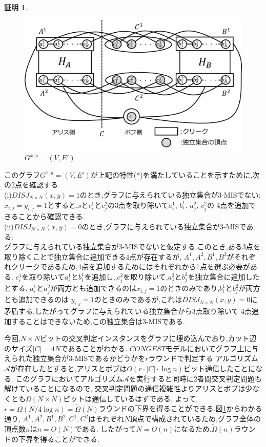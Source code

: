 \documentclass[12pt]{thesis}
\theoremstyle{definition}
\newtheorem*{prf*}{証明}
\begin{document}
\begin{prf*}
\begin{figure}[ht]
\begin{center}
\includegraphics[width=120mm]{3_Gxy.png}
\end{center}
\caption{$G^{x, y} = (V, E')$}
\label{3_G(x,y)}
\end{figure}

このグラフ$G^{x, y} = (V, E')$が上記の特性(*)を満たしていることを示すために,次の2点を確認する. \\
(i)$DISJ_{N \times N} (x, y) = 1$のとき,グラフに与えられている独立集合が3-MISでない: \\
$x_{i, j} = y_{i, j} =1$とすると,$s$と$c_{i}^{1}$と$c_{j}^{2}$の3点を取り除いて$a_{i}^{1}$, $b_{i}^{1}$, $a_{j}^{2}$, $c_{j}^{2}$の
4点を追加できることから確認できる. \\
(ii)$DISJ_{N \times N} (x, y) = 0$のとき,グラフに与えられている独立集合が3-MISである: \\ 
グラフに与えられている独立集合が3-MISでないと仮定する.このとき,ある3点を取り除くことで独立集合に追加できる4点が存在するが,
$A^{1}, A^{2}, B^{1}, B^{2}$がそれぞれクリークであるため,4点を追加するためにはそれぞれから1点を選ぶ必要がある.
$c_{i}^{1}$を取り除いて$a_{i}^{1}$と$b_{i}^{1}$を追加し,,$c_{j}^{2}$を取り除いて,$a_{j}^{2}$と$b_{j}^{2}$を独立集合に追加したとする.
$a_{i}^{1}$と$a_{j}^{2}$が両方とも追加できるのは$x_{i, j} = 1$のときのみであり,$b_{i}^{1}$と$b_{j}^{2}$が両方とも追加できるのは
$y_{i, j} = 1$のときのみであるが,これは$DISJ_{N \times N} (x, y) = 0$に矛盾する.したがってグラフに与えられている独立集合から3点取り除いて
4点追加することはできないため,この独立集合は3-MISである.

今回,$N \times N$ビットの交叉判定インスタンスをグラフに埋め込んでおり,カット辺のサイズ$|C| = 4N$であることがわかる.
$CONGEST$モデルにおいてグラフ上に与えられた独立集合が3-MISであるかどうかを$r$ラウンドで判定する
アルゴリズム$\mathcal{A}$が存在したとすると,アリスとボブは$O(r \cdot |C| \cdot \log n)$ビット通信したことになる.
このグラフにおいてアルゴリズム$\mathcal{A}$を実行すると同時に2者間交叉判定問題も解けていることになるので,
交叉判定問題の通信複雑性よりアリスとボブは少なくとも$\Omega (N \times N)$ビットは通信しているはずである.
よって,$r = \Omega (N / 4\log n) = \tilde{\Omega}(N)$ラウンドの下界を得ることができる.図\ref{3_G(x,y)}からわかる通り,
$A^{1}, A^{2}, B^{1}, B^{2}, C^{1}, C^{2}$はそれぞれ$N$頂点で構成されているため,グラフ全体の頂点数$n$は$n = O(N)$である.
したがって$N = O(n)$になるため,$\tilde{\Omega}(n)$ラウンドの下界を得ることができる. 
\end{prf*}
\newpage
\end{document}
